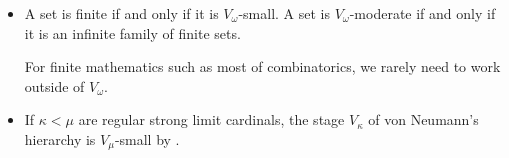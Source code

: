 \begin{example}\label{ex:large_and_small_sets}
  \hfill
  \begin{itemize}
    \item A set is finite if and only if it is \( V_\omega \)-small. A set is \( V_\omega \)-moderate if and only if it is an infinite family of finite sets.

    For finite mathematics such as most of combinatorics, we rarely need to work outside of \( V_\omega \).

    \item If \( \kappa < \mu \) are regular strong limit cardinals, the stage \( V_\kappa \) of von Neumann's hierarchy is \( V_\mu \)-small by .
  \end{itemize}
\end{example}


